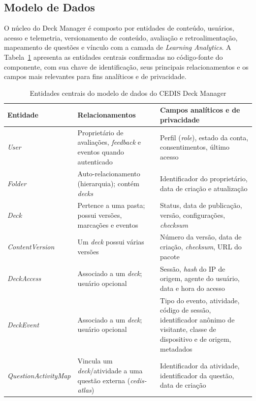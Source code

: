\subsection{Modelo de Dados}
\label{subsec:modelo-dados}

O núcleo do Deck Manager é composto por entidades de conteúdo, usuários,
acesso e telemetria, versionamento de conteúdo, avaliação e
retroalimentação, mapeamento de questões e vínculo com a camada de
\textit{Learning Analytics}. A Tabela~\ref{tab:entidades-deck-manager}
apresenta as entidades centrais confirmadas no código-fonte do
componente, com sua chave de identificação, seus principais
relacionamentos e os campos mais relevantes para fins analíticos e de
privacidade.

\begin{table}[htb]
\caption{Entidades centrais do modelo de dados do CEDIS Deck Manager}
\label{tab:entidades-deck-manager}
\centering
\begin{tabularx}{\textwidth}{l>{\raggedright\arraybackslash}X>{\raggedright\arraybackslash}X}
\hline
\textbf{Entidade} & \textbf{Relacionamentos} & \textbf{Campos analíticos e de privacidade} \\
\hline
\textit{User} & Proprietário de avaliações, \textit{feedback} e eventos quando autenticado & Perfil (\textit{role}), estado da conta, consentimentos, último acesso \\
\hline
\textit{Folder} & Auto-relacionamento (hierarquia); contém \textit{decks} & Identificador do proprietário, data de criação e atualização \\
\hline
\textit{Deck} & Pertence a uma pasta; possui versões, marcações e eventos & Status, data de publicação, versão, configurações, \textit{checksum} \\
\hline
\textit{ContentVersion} & Um \textit{deck} possui várias versões & Número da versão, data de criação, \textit{checksum}, URL do pacote \\
\hline
\textit{DeckAccess} & Associado a um \textit{deck}; usuário opcional & Sessão, \textit{hash} do IP de origem, agente do usuário, data e hora do acesso \\
\hline
\textit{DeckEvent} & Associado a um \textit{deck}; usuário opcional & Tipo do evento, atividade, código de sessão, identificador anônimo de visitante, classe de dispositivo e de origem, metadados \\
\hline
\textit{QuestionActivityMap} & Vincula um \textit{deck}/atividade a uma questão externa (\textit{cedis-atlas}) & Identificador da atividade, identificador da questão, data de criação \\

\end{tabularx}
\end{table}
